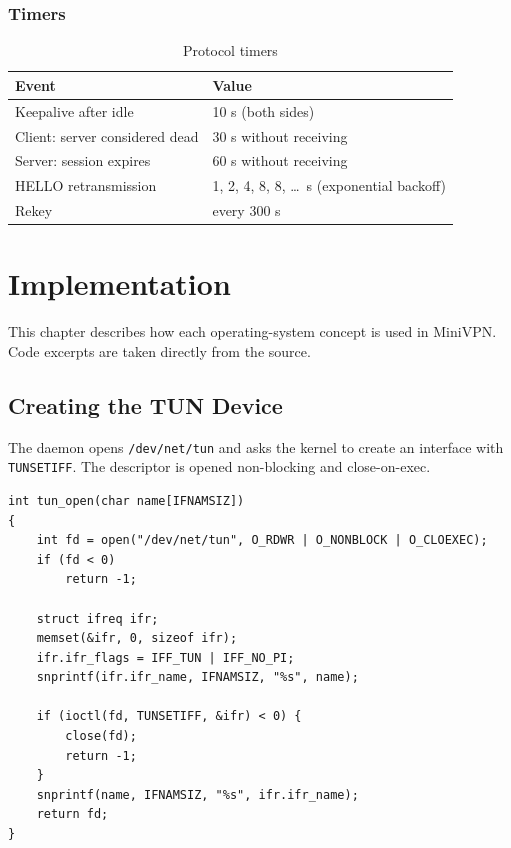 \documentclass[12pt,a4paper]{report}
\begin{document}
\subsection{Timers}
\begin{table}[H]
\centering
\caption{Protocol timers}
\begin{tabular}{@{}ll@{}}
\toprule
\textbf{Event} & \textbf{Value}\\
\midrule
Keepalive after idle & 10 s (both sides)\\
Client: server considered dead & 30 s without receiving\\
Server: session expires & 60 s without receiving\\
HELLO retransmission & 1, 2, 4, 8, 8, \ldots\ s (exponential backoff)\\
Rekey & every 300 s\\
\bottomrule
\end{tabular}
\end{table}

\chapter{Implementation}\label{ch:impl}
This chapter describes how each operating-system concept is used in MiniVPN. Code
excerpts are taken directly from the source.

\section{Creating the TUN Device}
The daemon opens \texttt{/dev/net/tun} and asks the kernel to create an interface with
\texttt{TUNSETIFF}. The descriptor is opened non-blocking and close-on-exec.

\begin{lstlisting}[caption={Creating a TUN interface (\texttt{src/tun.c})}]
int tun_open(char name[IFNAMSIZ])
{
    int fd = open("/dev/net/tun", O_RDWR | O_NONBLOCK | O_CLOEXEC);
    if (fd < 0)
        return -1;

    struct ifreq ifr;
    memset(&ifr, 0, sizeof ifr);
    ifr.ifr_flags = IFF_TUN | IFF_NO_PI;
    snprintf(ifr.ifr_name, IFNAMSIZ, "%s", name);

    if (ioctl(fd, TUNSETIFF, &ifr) < 0) {
        close(fd);
        return -1;
    }
    snprintf(name, IFNAMSIZ, "%s", ifr.ifr_name);
    return fd;
}
\end{lstlisting}
\end{document}
